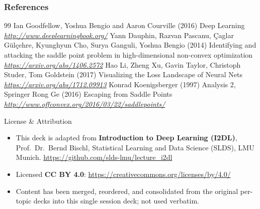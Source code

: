 \begin{vbframe}
\frametitle{References}
\footnotesize{
\begin{thebibliography}{99}
 Ian Goodfellow, Yoshua Bengio and Aaron Courville (2016)
\newblock Deep Learning
\newblock \emph{\url{http://www.deeplearningbook.org/}}
 Yann Dauphin, Razvan Pascanu, {\c{C}}aglar G{\"{u}}l{\c{c}}ehre, Kyunghyun Cho, Surya Ganguli, Yoshua Bengio (2014)
\newblock Identifying and attacking the saddle point problem in high-dimensional non-convex optimization
\newblock \emph{\url{https://arxiv.org/abs/1406.2572}}
 Hao Li, Zheng Xu, Gavin Taylor, Christoph Studer, Tom Goldstein (2017)
\newblock Visualizing the Loss Landscape of Neural Nets
\newblock \emph{\url{https://arxiv.org/abs/1712.09913}}
 Konrad Koenigsberger (1997)
\newblock Analysis 2, Springer
 Rong Ge (2016)
\newblock Escaping from Saddle Points
\newblock \emph{\url{http://www.offconvex.org/2016/03/22/saddlepoints/}}

\end{thebibliography}
}
\end{vbframe}

\begin{vbframe}{License \& Attribution}
\begin{itemize}
\item This deck is adapted from \textbf{Introduction to Deep Learning (I2DL)},
Prof.\ Dr.\ Bernd Bischl, Statistical Learning and Data Science (SLDS),
LMU Munich. \url{https://github.com/slds-lmu/lecture_i2dl}
\item Licensed \textbf{CC BY 4.0}: \url{https://creativecommons.org/licenses/by/4.0/}
\item Content has been merged, reordered, and consolidated from the original
per-topic decks into this single session deck; not used verbatim.
\end{itemize}
\end{vbframe}

\endlecture

